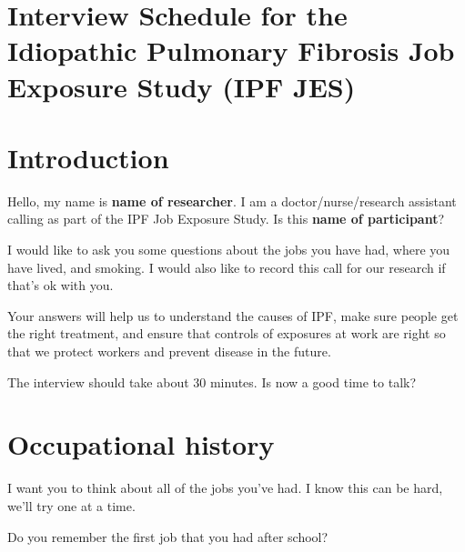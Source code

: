 \documentclass[a4paper,10pt]{article}
\begin{document}


\pagestyle{fancy}




\section*{Interview Schedule for the Idiopathic Pulmonary Fibrosis Job Exposure Study (IPF JES)}


\section{Introduction}

Hello, my name is \textbf{name of researcher}. I am a doctor/nurse/research assistant calling as part of the IPF Job Exposure Study. Is this \textbf{name of participant}? 

I would like to ask you some questions about the jobs you have had, where you have lived, and smoking. I would also like to record this call for our research if that's ok with you.  

Your answers will help us to understand the causes of IPF, make sure people get the right treatment, and ensure that controls of exposures at work are right so that we protect workers and prevent disease in the future.  

The interview should take about 30 minutes. Is now a good time to talk?

\section{Occupational history} 

I want you to think about all of the jobs you've had. I know this can be hard, we'll try one at a time. 

Do you remember the first job that you had after school?
\end{document}
